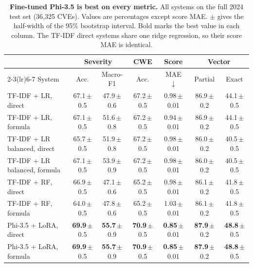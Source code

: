 \begin{table}[t]
\centering
\caption{\textbf{Fine-tuned Phi-3.5 is best on every metric.} All systems on the full 2024 test set (36{,}325 CVEs). Values are percentages except score MAE. $\pm$ gives the half-width of the 95\% bootstrap interval. Bold marks the best value in each column. The TF-IDF direct systems share one ridge regression, so their score MAE is identical.}
\label{tab:main}
\small
\setlength{\tabcolsep}{4pt}
\begin{tabular}{lcccccc}
\toprule
 & \multicolumn{2}{c}{Severity} & CWE & Score & \multicolumn{2}{c}{Vector} \\
\cmidrule(lr){2-3}\cmidrule(lr){6-7}
System & Acc. & Macro-F1 & Acc. & MAE $\downarrow$ & Partial & Exact \\
\midrule
TF-IDF + LR, direct & 67.1\,{\scriptsize$\pm$0.5} & 47.9\,{\scriptsize$\pm$0.6} & 67.2\,{\scriptsize$\pm$0.5} & 0.98\,{\scriptsize$\pm$0.01} & 86.9\,{\scriptsize$\pm$0.2} & 44.1\,{\scriptsize$\pm$0.5} \\
TF-IDF + LR, formula & 67.1\,{\scriptsize$\pm$0.5} & 51.6\,{\scriptsize$\pm$0.8} & 67.2\,{\scriptsize$\pm$0.5} & 0.94\,{\scriptsize$\pm$0.01} & 86.9\,{\scriptsize$\pm$0.2} & 44.1\,{\scriptsize$\pm$0.5} \\
TF-IDF + LR balanced, direct & 65.7\,{\scriptsize$\pm$0.5} & 51.9\,{\scriptsize$\pm$0.8} & 67.2\,{\scriptsize$\pm$0.5} & 0.98\,{\scriptsize$\pm$0.01} & 86.0\,{\scriptsize$\pm$0.2} & 40.5\,{\scriptsize$\pm$0.5} \\
TF-IDF + LR balanced, formula & 67.1\,{\scriptsize$\pm$0.5} & 53.9\,{\scriptsize$\pm$0.9} & 67.2\,{\scriptsize$\pm$0.5} & 0.98\,{\scriptsize$\pm$0.01} & 86.0\,{\scriptsize$\pm$0.2} & 40.5\,{\scriptsize$\pm$0.5} \\
TF-IDF + RF, direct & 66.9\,{\scriptsize$\pm$0.5} & 47.1\,{\scriptsize$\pm$0.6} & 65.2\,{\scriptsize$\pm$0.5} & 0.98\,{\scriptsize$\pm$0.01} & 86.1\,{\scriptsize$\pm$0.2} & 41.8\,{\scriptsize$\pm$0.5} \\
TF-IDF + RF, formula & 64.0\,{\scriptsize$\pm$0.5} & 47.8\,{\scriptsize$\pm$0.6} & 65.2\,{\scriptsize$\pm$0.5} & 1.03\,{\scriptsize$\pm$0.01} & 86.1\,{\scriptsize$\pm$0.2} & 41.8\,{\scriptsize$\pm$0.5} \\
Phi-3.5 + LoRA, direct & \textbf{69.9}\,{\scriptsize$\pm$0.5} & \textbf{55.7}\,{\scriptsize$\pm$0.9} & \textbf{70.9}\,{\scriptsize$\pm$0.5} & \textbf{0.85}\,{\scriptsize$\pm$0.01} & \textbf{87.9}\,{\scriptsize$\pm$0.2} & \textbf{48.8}\,{\scriptsize$\pm$0.5} \\
Phi-3.5 + LoRA, formula & \textbf{69.9}\,{\scriptsize$\pm$0.5} & \textbf{55.7}\,{\scriptsize$\pm$0.9} & \textbf{70.9}\,{\scriptsize$\pm$0.5} & \textbf{0.85}\,{\scriptsize$\pm$0.01} & \textbf{87.9}\,{\scriptsize$\pm$0.2} & \textbf{48.8}\,{\scriptsize$\pm$0.5} \\
\bottomrule
\end{tabular}
\end{table}
